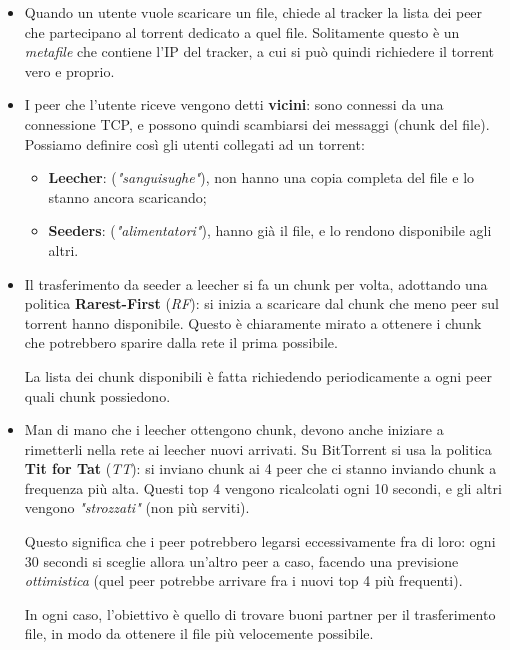 \documentclass[a4paper,11pt]{article}
\begin{document}
\begin{itemize}
	\item 
Quando un utente vuole scaricare un file, chiede al tracker la lista dei peer che partecipano al torrent dedicato a quel file.
Solitamente questo è un \textit{metafile} che contiene l'IP del tracker, a cui si può quindi richiedere il torrent vero e proprio. 

	\item
I peer che l'utente riceve vengono detti \textbf{vicini}: sono connessi da una connessione TCP, e possono quindi scambiarsi dei messaggi (chunk del file).
Possiamo definire così gli utenti collegati ad un torrent:
\begin{itemize}
	\item \textbf{Leecher}: (\textit{"sanguisughe"}), non hanno una copia completa del file e lo stanno ancora scaricando;
	\item \textbf{Seeders}: (\textit{"alimentatori"}), hanno già il file, e lo rendono disponibile agli altri.
\end{itemize}

	\item
Il trasferimento da seeder a leecher si fa un chunk per volta, adottando una politica \textbf{Rarest-First} (\textit{RF}): si inizia a scaricare dal chunk che meno peer sul torrent hanno disponibile. Questo è chiaramente mirato a ottenere i chunk che potrebbero sparire dalla rete il prima possibile.

La lista dei chunk disponibili è fatta richiedendo periodicamente a ogni peer quali chunk possiedono.

	\item 
		Man di mano che i leecher ottengono chunk, devono anche iniziare a rimetterli nella rete ai leecher nuovi arrivati. Su BitTorrent si usa la politica \textbf{Tit for Tat} (\textit{TT}): si inviano chunk ai 4 peer che ci stanno inviando chunk a frequenza più alta.
		Questi top 4 vengono ricalcolati ogni 10 secondi, e gli altri vengono \textit{"strozzati"} (non più serviti).

		Questo significa che i peer potrebbero legarsi eccessivamente fra di loro: ogni 30 secondi si sceglie allora un'altro peer a caso, facendo una previsione \textit{ottimistica} (quel peer potrebbe arrivare fra i nuovi top 4 più frequenti).

		In ogni caso, l'obiettivo è quello di trovare buoni partner per il trasferimento file, in modo da ottenere il file più velocemente possibile.
\end{itemize}
\end{document}
